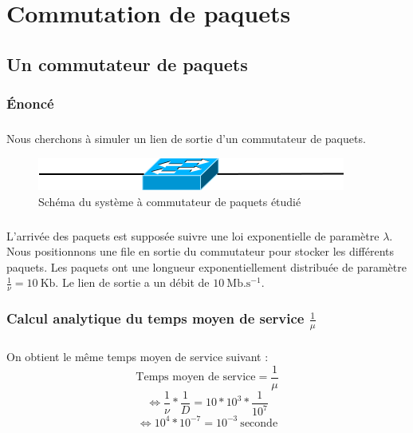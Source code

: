 %
\chapter{Commutation de paquets}
%
    \section{Un commutateur de paquets}
%
        \subsection{Énoncé}
%
            \paragraph{}
Nous cherchons à simuler un lien de sortie d'un commutateur de paquets.
%
            \begin{figure}[h]
                \centering
                \includegraphics[scale=0.7]{RSC/2-0.png}
                \caption{ Schéma du système à commutateur de paquets étudié }
                \label{ Schema du systeme a commutateur de paquets }
            \end{figure}
%
            \paragraph{}
L'arrivée des paquets est supposée suivre une loi exponentielle de paramètre $\lambda$.
Nous positionnons une file en sortie du commutateur pour stocker les différents paquets.
Les paquets ont une longueur exponentiellement distribuée de paramètre $\frac{1}{\nu} = 10 \ \text{Kb}$.
Le lien de sortie a un débit de $10 \ \text{Mb}.\text{s}^{-1}$.
%
%
        \subsection{Calcul analytique du temps moyen de service $\frac{1}{\mu}$}
%
                \paragraph{}
On obtient le même temps moyen de service suivant :
%
            \[  \text{Temps moyen de service} = \frac{1}{\mu} \]
            \[ \iff \frac{1}{\nu} * \frac{1}{D} = 10 * 10^{3} * \frac{1}{10^{7}} \]
            \[ \iff 10^{4} * 10^{-7} = 10^{-3} \ \text{seconde} \]
%
%
